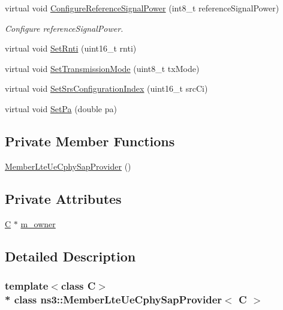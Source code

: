 \begin{DoxyCompactItemize}
virtual void \hyperlink{classns3_1_1MemberLteUeCphySapProvider_add4951cc6a15e8ef7209bf65e0d4f82b}{Configure\+Reference\+Signal\+Power} (int8\+\_\+t reference\+Signal\+Power)
\begin{DoxyCompactList}\small\item\em Configure reference\+Signal\+Power. \end{DoxyCompactList}\item 
virtual void \hyperlink{classns3_1_1MemberLteUeCphySapProvider_a5663698d673c2d69a590e7c9356817e5}{Set\+Rnti} (uint16\+\_\+t rnti)
\item 
virtual void \hyperlink{classns3_1_1MemberLteUeCphySapProvider_ad76e2d440c7a5f7ea5711342c368de6f}{Set\+Transmission\+Mode} (uint8\+\_\+t tx\+Mode)
\item 
virtual void \hyperlink{classns3_1_1MemberLteUeCphySapProvider_a39afea1c4a7dd4681d6d6688790b6242}{Set\+Srs\+Configuration\+Index} (uint16\+\_\+t src\+Ci)
\item 
virtual void \hyperlink{classns3_1_1MemberLteUeCphySapProvider_a295a2907524a7ed2b337886c2a0085d3}{Set\+Pa} (double pa)
\end{DoxyCompactItemize}
\subsection*{Private Member Functions}
\begin{DoxyCompactItemize}
\item 
\hyperlink{classns3_1_1MemberLteUeCphySapProvider_aa3ab93e78351e5944b41ddd5023b7b24}{Member\+Lte\+Ue\+Cphy\+Sap\+Provider} ()
\end{DoxyCompactItemize}
\subsection*{Private Attributes}
\begin{DoxyCompactItemize}
\item 
\hyperlink{loss__COST231__small__cities__urban_8m_aaa53ca0b650dfd85c4f59fa156f7a2cc}{C} $\ast$ \hyperlink{classns3_1_1MemberLteUeCphySapProvider_a5acff2ce8a59f367fa74fa321c088bd8}{m\+\_\+owner}
\end{DoxyCompactItemize}


\subsection{Detailed Description}
\subsubsection*{template$<$class C$>$\\*
class ns3\+::\+Member\+Lte\+Ue\+Cphy\+Sap\+Provider$<$ C $>$}

